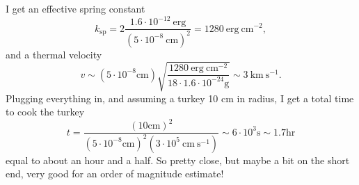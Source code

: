 \documentclass[11pt]{article}
\begin{document}
I get an effective spring constant
\begin{equation}
  k_{\text{sp}} = 2 \frac{1.6 \cdot 10^{-12} ~ \text{erg}}{\left (5 \cdot 10^{-8} ~ \text{cm} \right )^2 } = 1280 ~ \text{erg} ~\text{cm}^{-2},
\end{equation}
and a thermal velocity
\begin{equation}
 v \sim \left( 5 \cdot 10^{-8} \text{cm} \right ) \sqrt{\frac{1280 ~ \text{erg} ~\text{cm}^{-2}}{18 \cdot 1.6 \cdot 10^{-24} \text{g}}} \sim 3 ~\text{km} ~\text{s}^{-1}.
\end{equation}
Plugging everything in, and assuming a turkey 10 cm in radius, I get a total time to cook the turkey
\begin{equation}
 t = \frac{\left( 10 \text{cm}  \right)^2 }{\left( 5 \cdot 10^{-8} \text{cm} \right)^2 \left( 3 \cdot 10^5 ~\text{cm} ~\text{s}^{-1}  \right)  } \sim 6 \cdot 10^3 \text{s} \sim 1.7 \text{hr}
\end{equation}
equal to about an hour and a half.
So pretty close, but maybe a bit on the short end, very good for an order of magnitude estimate!
\end{document}
